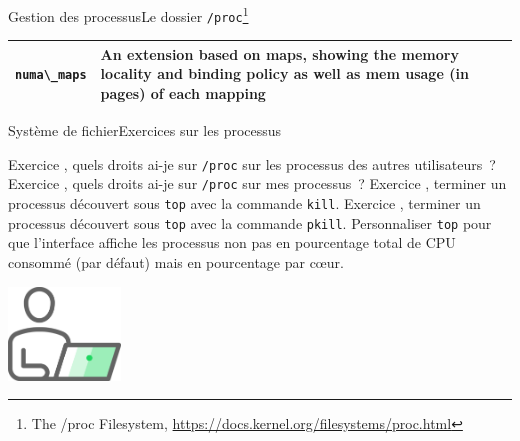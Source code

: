 \documentclass{beamer}
\begin{document}
\begin{frame}{Gestion des processus}{Le dossier \lstinline{/proc}\footnote{The /proc Filesystem, \url{https://docs.kernel.org/filesystems/proc.html}}}
\begin{footnotesize}
\begin{tiny}
\begin{table}[h!]
\begin{tabular}{|p{2cm}|p{8cm}|}
                        \hline
                        \lstinline{numa\_maps}    & An extension based on maps, showing the memory locality and binding policy as well as mem usage (in pages) of each mapping      \\
                        \hline
                    \end{tabular}
                \end{table}
            \end{tiny}
        \end{footnotesize}
    \end{frame}

    \begin{frame}{Système de fichier}{Exercices sur les processus}
        \begin{small}
            Exercice \execcounterdispinc{}, quels droits ai-je sur \lstinline{/proc} sur les processus des autres utilisateurs~?
            \bigbreak
            Exercice \execcounterdispinc{}, quels droits ai-je sur \lstinline{/proc} sur mes processus~?
            \bigbreak
            Exercice \execcounterdispinc{}, terminer un processus découvert sous \lstinline{top} avec la commande \lstinline{kill}.
            \bigbreak
            Exercice \execcounterdispinc{}, terminer un processus découvert sous \lstinline{top} avec la commande \lstinline{pkill}.
            \bigbreak
            Personnaliser \lstinline{top} pour que l'interface affiche les processus non pas en pourcentage total de CPU consommé (par défaut) mais en pourcentage par cœur.
        \end{small}
        \begin{center}
            \includegraphics[width=3cm]{image/guy-in-front-of-desktop}
        \end{center}
    \end{frame}
\end{document}
